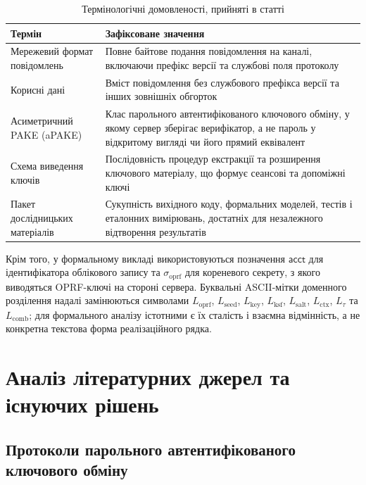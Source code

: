 \documentclass{llncs}
\newcommand{\acct}{\mathsf{acct}}
\newcommand{\sigoprf}{\sigma_{\mathrm{oprf}}}
\newcommand{\Label}[1]{L_{\mathrm{#1}}}
\begin{document}
\begin{table}[htbp]
\caption{Термінологічні домовленості, прийняті в статті}
\label{tab:terminology}
\centering\small
\begin{tabularx}{\textwidth}{@{}L{3.2cm}X@{}}
\toprule
Термін & Зафіксоване значення \\
\midrule
Мережевий формат повідомлень & Повне байтове подання повідомлення на каналі, включаючи префікс версії та службові поля протоколу \\
Корисні дані & Вміст повідомлення без службового префікса версії та інших зовнішніх обгорток \\
Асиметричний PAKE (aPAKE) & Клас парольного автентифікованого ключового обміну, у якому сервер зберігає верифікатор, а не пароль у відкритому вигляді чи його прямий еквівалент \\
Схема виведення ключів & Послідовність процедур екстракції та розширення ключового матеріалу, що формує сеансові та допоміжні ключі \\
Пакет дослідницьких матеріалів & Сукупність вихідного коду, формальних моделей, тестів і еталонних вимірювань, достатніх для незалежного відтворення результатів \\
\bottomrule
\end{tabularx}
\end{table}

Крім того, у формальному викладі використовуються позначення
$\acct$ для ідентифікатора облікового запису та $\sigoprf$ для
кореневого секрету, з якого виводяться OPRF-ключі на стороні сервера.
Буквальні ASCII-мітки доменного розділення надалі замінюються
символами $\Label{oprf}$, $\Label{seed}$, $\Label{key}$,
$\Label{ksf}$, $\Label{salt}$, $\Label{ctx}$, $L_{\tau}$ та
$\Label{comb}$; для формального аналізу істотними є їх сталість і
взаємна відмінність, а не конкретна текстова форма реалізаційного
рядка.

\section{Аналіз літературних джерел та існуючих рішень}

\subsection{Протоколи парольного автентифікованого ключового обміну}
\end{document}
